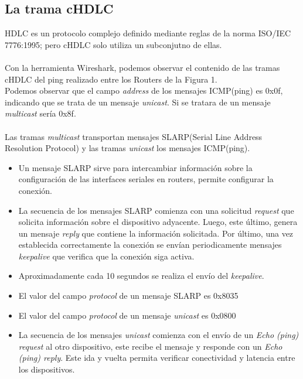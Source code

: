 \documentclass{article}
\begin{document}
\subsection{La trama cHDLC}
HDLC es un protocolo complejo definido mediante reglas de la norma ISO/IEC 7776:1995; pero cHDLC solo utiliza un subconjutno de ellas.
\\\\
Con la herramienta Wireshark, podemos observar el contenido de las tramas cHDLC del ping realizado entre los Routers de la Figura 1.
\\Podemos observar que el campo \textit{address} de los mensajes ICMP(ping) es 0x0f, indicando que se trata de un mensaje \textit{unicast}. Si se tratara de un mensaje \textit{multicast} sería 0x8f.
\\\\
Las tramas \textit{multicast} transportan mensajes SLARP(Serial Line Address Resolution Protocol) y las tramas \textit{unicast} los mensajes ICMP(ping).
\begin{itemize}
    \item Un mensaje SLARP sirve para intercambiar información sobre la configuración de las interfaces seriales en routers, permite configurar la conexión.
    \item La secuencia de los mensajes SLARP comienza con una solicitud \textit{request} que solicita información sobre el dispositivo adyacente. Luego, este último, genera un mensaje \textit{reply} que contiene la información solicitada. Por último, una vez establecida correctamente la conexión se envían periodicamente mensajes \textit{keepalive} que verifica que la conexión siga activa. 
    \item Aproximadamente cada 10 segundos se realiza el envío del \textit{keepalive}.
    \item El valor del campo \textit{protocol} de un mensaje SLARP es 0x8035
    \item El valor del campo \textit{protocol} de un mensaje \textit{unicast} es 0x0800
    \item La secuencia de los mensajes \textit{unicast} comienza con el envío de un \textit{Echo (ping) request} al otro dispositivo, este recibe el mensaje y responde con un \textit{Echo (ping) reply}. Este ida y vuelta permita verificar conectividad y latencia  entre los dispositivos.
\end{itemize}
\end{document}
